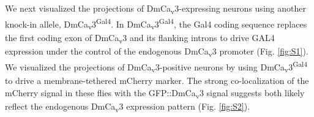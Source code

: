 We next visualized the projections of DmCa\textsubscript{v}3-expressing neurons using another knock-in allele, DmCa\textsubscript{v}3\textsuperscript{Gal4}.
In DmCa\textsubscript{v}3\textsuperscript{Gal4}, the Gal4 coding sequence replaces the first coding exon of DmCa\textsubscript{v}3 and its flanking introns to drive GAL4 expression under the control of the endogenous DmCa\textsubscript{v}3 promoter (Fig. \ref{fig:S1}).
We visualized the projections of DmCa\textsubscript{v}3-positive neurons by using DmCa\textsubscript{v}3\textsuperscript{Gal4} to drive a membrane-tethered mCherry marker.
The strong co-localization of the mCherry signal in these flies with the GFP::DmCa\textsubscript{v}3 signal suggests both likely reflect the endogenous DmCa\textsubscript{v}3 expression pattern (Fig. \ref{fig:S2}).
    
    
    
    
    
    
    
    
  
  